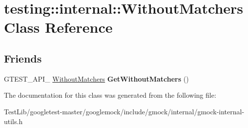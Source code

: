 \hypertarget{classtesting_1_1internal_1_1WithoutMatchers}{}\section{testing\+:\+:internal\+:\+:Without\+Matchers Class Reference}
\label{classtesting_1_1internal_1_1WithoutMatchers}
\subsection*{Friends}
\begin{DoxyCompactItemize}
\item 
\mbox{\label{classtesting_1_1internal_1_1WithoutMatchers_aec6c0de08b3c9096e2365c023664a848}} 
G\+T\+E\+S\+T\+\_\+\+A\+P\+I\+\_\+ \hyperlink{classtesting_1_1internal_1_1WithoutMatchers}{Without\+Matchers} {\bfseries Get\+Without\+Matchers} ()
\end{DoxyCompactItemize}


The documentation for this class was generated from the following file\+:\begin{DoxyCompactItemize}
\item 
Test\+Lib/googletest-\/master/googlemock/include/gmock/internal/gmock-\/internal-\/utils.\+h\end{DoxyCompactItemize}
